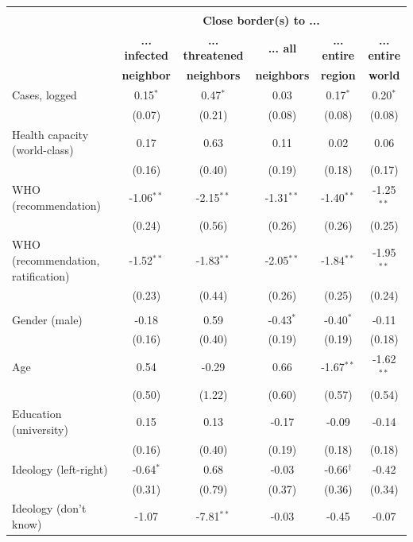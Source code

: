 \begin{table}[ht!]
\begin{center}
\footnotesize
\renewcommand{\arraystretch}{1.05}
\begin{tabular}{@{\extracolsep{4.8pt}}lccccc} 
\\[-1.8ex]\hline \\[-1.8ex]
 & \multicolumn{5}{c}{\normalsize{\textbf{Close border(s) to ...}}}
\\
  & \small{\textbf{... infected}} & \small{\textbf{... threatened}} & \small{\textbf{... all}} & \small{\textbf{... entire }} & \small{\textbf{... entire}}
 \\
  & \small{\textbf{neighbor}} & \small{\textbf{neighbors}} & \small{\textbf{neighbors}} & \small{\textbf{region}} & \small{\textbf{world}}
 \\
\hline
Cases, logged & 0.15$^{*}$ & 0.47$^{*}$ & 0.03 & 0.17$^{*}$ & 0.20$^{*}$\\
 & (0.07) & (0.21) & (0.08) & (0.08) & (0.08)\\
Health capacity (world-class) & 0.17 & 0.63 & 0.11 & 0.02 & 0.06\\
 & (0.16) & (0.40) & (0.19) & (0.18) & (0.17)\\
WHO (recommendation) & -1.06$^{**}$ & -2.15$^{**}$ & -1.31$^{**}$ & -1.40$^{**}$ & -1.25$^{**}$\\
 & (0.24) & (0.56) & (0.26) & (0.26) & (0.25)\\
WHO (recommendation, ratification) & -1.52$^{**}$ & -1.83$^{**}$ & -2.05$^{**}$ & -1.84$^{**}$ & -1.95$^{**}$\\
 & (0.23) & (0.44) & (0.26) & (0.25) & (0.24)\\
\\
Gender (male) & -0.18 & 0.59 & -0.43$^{*}$ & -0.40$^{*}$ & -0.11\\
 & (0.16) & (0.40) & (0.19) & (0.19) & (0.18)\\
Age & 0.54 & -0.29 & 0.66 & -1.67$^{**}$ & -1.62$^{**}$\\
 & (0.50) & (1.22) & (0.60) & (0.57) & (0.54)\\
Education (university) & 0.15 & 0.13 & -0.17 & -0.09 & -0.14\\
 & (0.16) & (0.40) & (0.19) & (0.18) & (0.18)\\
Ideology (left-right) & -0.64$^{*}$ & 0.68 & -0.03 & -0.66$^{\dag}$ & -0.42\\
 & (0.31) & (0.79) & (0.37) & (0.36) & (0.34)\\
Ideology (don't know) & -1.07 & -7.81$^{**}$ & -0.03 & -0.45 & -0.07\\

\end{tabular}
\end{center}
\end{table}
